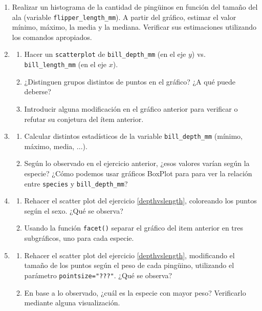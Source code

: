 \documentclass[a4paper,11pt]{article}
\theoremstyle{definition}
\begin{document}
\begin{enumerate}[resume]
\item Realizar un histograma de la cantidad de pingüinos en función del tamaño del ala (variable \lstinline{flipper_length_mm}). A partir del gráfico, estimar el valor mínimo, máximo, la media y la mediana. Verificar sus estimaciones utilizando los comandos apropiados.

\item \label{depthvslength}
\begin{enumerate}
\item Hacer un \lstinline{scatterplot} de \lstinline{bill_depth_mm} (en el eje $y$) vs. \lstinline{bill_length_mm} (en el eje $x$).
\item ¿Distinguen grupos distintos de puntos en el gráfico? ¿A qué puede deberse?
\item Introducir alguna modificación en el gráfico anterior para verificar o refutar su conjetura del ítem anterior.
\end{enumerate}

\item \begin{enumerate}
\item Calcular distintos estadísticos de la variable \lstinline{bill_depth_mm} (mínimo, máximo, media, ...).
\item Según lo observado en el ejercicio anterior, ¿esos valores varían según la especie? ¿Cómo podemos usar gráficos BoxPlot para para ver la relaci\'on entre \lstinline{species} y \lstinline{bill_depth_mm}?
\end{enumerate}

\item
\begin{enumerate}
\item Rehacer el scatter plot del ejercicio \ref{depthvslength}, coloreando los puntos según el sexo. ¿Qué se observa?
\item Usando la función \lstinline{facet()} separar el gráfico del item anterior en tres subgráficos, uno para cada especie.
\end{enumerate}

\item 
\begin{enumerate}
\item Rehacer el scatter plot del ejercicio \ref{depthvslength}, modificando el tamaño de los puntos según el peso de cada pingüino, utilizando el parámetro \lstinline{pointsize="???"}. ¿Qué se observa?
\item En base a lo observado, ¿cuál es la especie con mayor peso? Verificarlo mediante alguna visualización.
\end{enumerate}


\end{enumerate}
\end{document}
